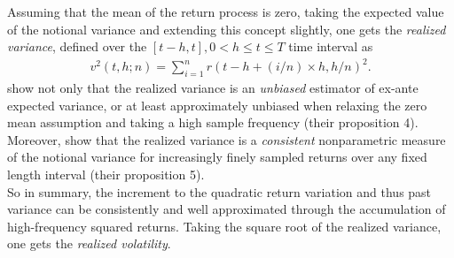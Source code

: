 Assuming that the mean of the return process is zero, taking the expected value of the notional variance and extending this concept slightly, one gets the \emph{realized variance}, defined over the $[t-h,t], 0 < h \leq t \leq T$ time interval as
\begin{align}\label{eq:RV-andersen}
v^2(t,h;n) = \sum_{i=1}^{n} r(t-h+(i/n) \times h,h/n)^2.
\end{align}
\citeauthor{andersen2001} show not only that the realized variance is an \emph{unbiased} estimator of ex-ante expected variance, or at least approximately unbiased when relaxing the zero mean assumption and taking a high sample frequency (their proposition 4). Moreover, \citeauthor{andersen2001} show that the realized variance is a \emph{consistent} nonparametric measure of the notional variance for increasingly finely sampled returns over any fixed length interval (their proposition 5).\\
So in summary, the increment to the quadratic return variation and thus past variance can be consistently and well approximated through the accumulation of high-frequency squared returns. Taking the square root of the realized variance, one gets the \emph{realized volatility}.\\ 


